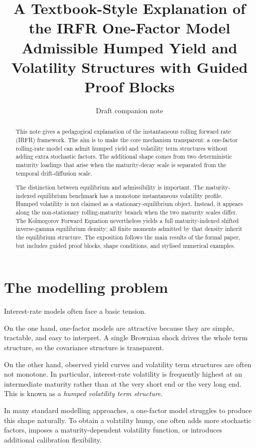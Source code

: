 \documentclass[11pt]{article}
\title{A Textbook-Style Explanation of the IRFR One-Factor Model\\
\large Admissible Humped Yield and Volatility Structures with Guided Proof Blocks}
\author{Draft companion note}
\date{}
\theoremstyle{plainbreak}
\begin{document}
\maketitle

\begin{abstract}
This note gives a pedagogical explanation of the instantaneous rolling forward rate (IRFR) framework. The aim is to make the core mechanism transparent: a one-factor rolling-rate model can admit humped yield and volatility term structures without adding extra stochastic factors. The additional shape comes from two deterministic maturity loadings that arise when the maturity-decay scale is separated from the temporal drift-diffusion scale.

The distinction between equilibrium and admissibility is important. The maturity-indexed equilibrium benchmark has a monotone instantaneous volatility profile. Humped volatility is not claimed as a stationary-equilibrium object. Instead, it appears along the non-stationary rolling-maturity branch when the two maturity scales differ. The Kolmogorov Forward Equation nevertheless yields a full maturity-indexed shifted inverse-gamma equilibrium density; all finite moments admitted by that density inherit the equilibrium structure. The exposition follows the main results of the formal paper, but includes guided proof blocks, shape conditions, and stylised numerical examples.
\end{abstract}

\tableofcontents
\newpage

\section{The modelling problem}

Interest-rate models often face a basic tension.

On the one hand, one-factor models are attractive because they are simple, tractable, and easy to interpret. A single Brownian shock drives the whole term structure, so the covariance structure is transparent.

On the other hand, observed yield curves and volatility term structures are often not monotone. In particular, interest-rate volatility is frequently highest at an intermediate maturity rather than at the very short end or the very long end. This is known as a \emph{humped volatility term structure}.

In many standard modelling approaches, a one-factor model struggles to produce this shape naturally. To obtain a volatility hump, one often adds more stochastic factors, imposes a maturity-dependent volatility function, or introduces additional calibration flexibility.
\end{document}
